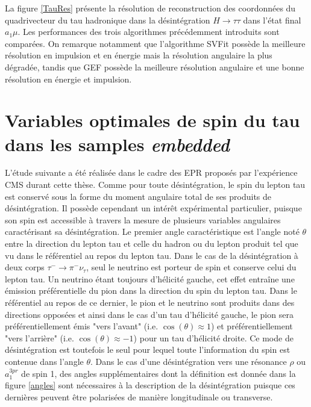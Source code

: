 La figure \ref{TauRes} présente la résolution de reconstruction des coordonnées du quadrivecteur du tau hadronique dans la désintégration $H\rightarrow\tau\tau$ dans l'état final $a_1\mu$. Les performances des trois algorithmes précédemment introduits sont comparées. On remarque notamment que l'algorithme SVFit possède la meilleure résolution en impulsion et en énergie mais la résolution angulaire la plus dégradée, tandis que GEF possède la meilleure résolution angulaire et une bonne résolution en énergie et impulsion.

\section{Variables optimales de spin du tau dans les samples \textit{embedded}}
\label{optvar}

L'étude suivante a été réalisée dans le cadre des EPR proposés par l'expérience CMS durant cette thèse. Comme pour toute désintégration, le spin du lepton tau est conservé sous la forme du moment angulaire total de ses produits de désintégration. Il possède cependant un intérêt expérimental particulier, puisque son spin est accessible à travers la mesure de plusieurs variables angulaires caractérisant sa désintégration. Le premier angle caractéristique est l'angle noté $\theta$ entre la direction du lepton tau et celle du hadron ou du lepton produit tel que vu dans le référentiel au repos du lepton tau. Dans le cas de la désintégration à deux corps $\tau^-\rightarrow\pi^-\nu_{\tau}$, seul le neutrino est porteur de spin et conserve celui du lepton tau. Un neutrino étant toujours d'hélicité gauche, cet effet entraîne une émission préférentielle du pion dans la direction du spin du lepton tau. Dans le référentiel au repos de ce dernier, le pion et le neutrino sont produits dans des directions opposées et ainsi dans le cas d'un tau d'hélicité gauche, le pion sera préférentiellement émis "vers l'avant" (i.e. $\cos(\theta)\approx 1$) et préférentiellement "vers l'arrière" (i.e. $\cos(\theta)\approx -1$) pour un tau d'hélicité droite. Ce mode de désintégration est toutefois le seul pour lequel toute l'information du spin est contenue dans l'angle $\theta$. Dans le cas d'une désintégration vers une résonance $\rho$ ou $a_1^{3pr}$ de spin 1, des angles supplémentaires dont la définition est donnée dans la figure \ref{angles} sont nécessaires à la description de la désintégration puisque ces dernières peuvent être polarisées de manière longitudinale ou transverse. \\

